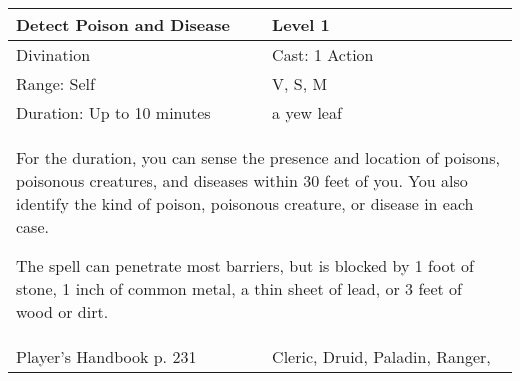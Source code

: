 \documentclass[11pt]{report}
\begin{document}
\begin{table}[H]
	\begin{tabular}{||p{6cm}|p{6cm}||}
		\hline\hline
		\bf{Detect Poison and Disease} & Level 1\\ \hline
		Divination & Cast: 1 Action\\ \hline
		Range: Self & V, S, M \\ \hline
		Duration: Up to 10 minutes & a yew leaf\\ \hline
		\multicolumn{2}{||p{12cm}||}{For the duration, you can sense the presence and location of poisons, poisonous creatures, and diseases within 30 feet of you. You also identify the kind of poison, poisonous creature, or disease in each case. 

The spell can penetrate most barriers, but is blocked by 1 foot of stone, 1 inch of common metal, a thin sheet of lead, or 3 feet of wood or dirt.}\\ \hline
Player's Handbook p. 231 & Cleric, Druid, Paladin, Ranger, \\ \hline\hline
	\end{tabular}
\end{table}
\end{document}
